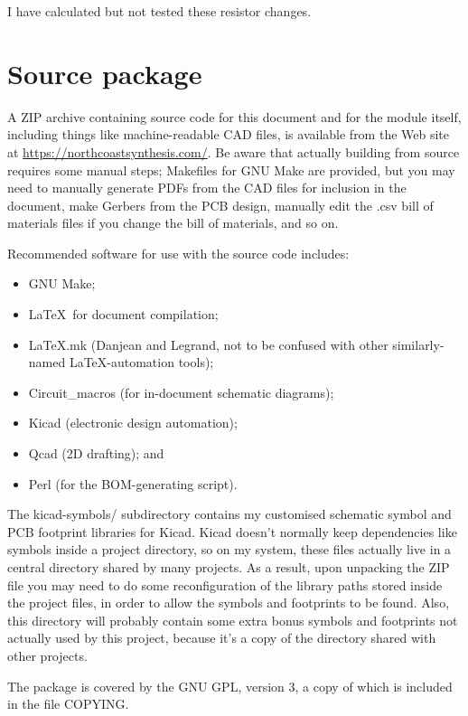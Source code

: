 I have calculated but not tested these resistor changes.

\section{Source package}

A ZIP archive containing source code for this document and for the module
itself, including things like machine-readable CAD files, is available from 
the Web site at 
\url{https://northcoastsynthesis.com/}.  Be aware that actually building
from source requires some manual steps; Makefiles for GNU Make are provided,
but you may need to manually generate PDFs from the CAD files for inclusion
in the document, make Gerbers from the PCB design, manually edit the .csv
bill of materials files if you change the bill of materials, and so on.

Recommended software for use with the source code includes:
\begin{itemize}
  \item GNU Make;
  \item \LaTeX\ for document compilation;
  \item LaTeX.mk (Danjean and Legrand, not to be confused with other
    similarly-named \LaTeX-automation tools);
  \item Circuit\_macros (for in-document schematic diagrams);
  \item Kicad (electronic design automation);
  \item Qcad (2D drafting); and
  \item Perl (for the BOM-generating script).
\end{itemize}

The kicad-symbols/ subdirectory contains my customised schematic symbol and
PCB footprint libraries for Kicad.  Kicad doesn't normally keep dependencies
like symbols inside a project directory, so on my system, these files
actually live in a central directory shared by many projects.  As a result,
upon unpacking the ZIP file you may need to do some reconfiguration of the
library paths stored inside the project files, in order to allow the symbols
and footprints to be found.  Also, this directory will probably contain some
extra bonus symbols and footprints not actually used by this project,
because it's a copy of the directory shared with other projects.

The package is covered by the GNU GPL, version 3, a copy of which is
included in the file COPYING.

